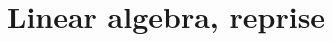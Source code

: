 \documentclass[../master.tex]{subfiles}
\begin{document}
\chapter{Linear algebra, reprise}


\end{document}
